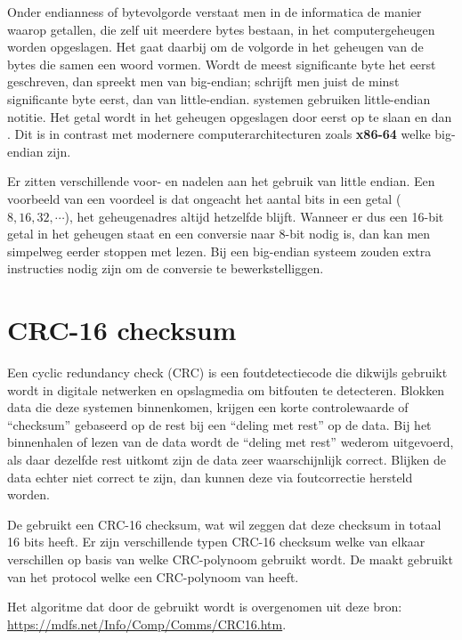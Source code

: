 Onder endianness of bytevolgorde verstaat men in de informatica de manier waarop getallen, die zelf uit meerdere bytes bestaan, in het computergeheugen worden opgeslagen. Het gaat daarbij om de volgorde in het geheugen van de bytes die samen een woord vormen. Wordt de meest significante byte het eerst geschreven, dan spreekt men van big-endian; schrijft men juist de minst significante byte eerst, dan van little-endian.  systemen gebruiken little-endian notitie. Het getal  wordt in het geheugen opgeslagen door eerst  op te slaan en dan . Dit is in contrast met modernere computerarchitecturen zoals \textbf{x86-64} welke big-endian zijn.

Er zitten verschillende voor- en nadelen aan het gebruik van little endian. Een voorbeeld van een voordeel is dat ongeacht het aantal bits in een getal ($8, 16, 32, \cdots$), het geheugenadres altijd hetzelfde blijft. Wanneer er dus een 16-bit getal in het geheugen staat en een conversie naar 8-bit nodig is, dan kan men simpelweg eerder stoppen met lezen. Bij een big-endian systeem zouden extra instructies nodig zijn om de conversie te bewerkstelliggen.

%
%
%
\section{CRC-16 checksum}
\label{sec:crc16-checksum}

Een cyclic redundancy check (CRC) is een foutdetectiecode die dikwijls gebruikt wordt in digitale netwerken en opslagmedia om bitfouten te detecteren. Blokken data die deze systemen binnenkomen, krijgen een korte controlewaarde of ``checksum'' gebaseerd op de rest bij een ``deling met rest'' op de data. Bij het binnenhalen of lezen van de data wordt de ``deling met rest'' wederom uitgevoerd, als daar dezelfde rest uitkomt zijn de data zeer waarschijnlijk correct. Blijken de data echter niet correct te zijn, dan kunnen deze via foutcorrectie hersteld worden.

De \product gebruikt een CRC-16 checksum, wat wil zeggen dat deze checksum in totaal 16 bits heeft. Er zijn verschillende typen CRC-16 checksum welke van elkaar verschillen op basis van welke CRC-polynoom gebruikt wordt. De \product maakt gebruikt van het  protocol welke een CRC-polynoom van  heeft.

Het algoritme dat door de \product gebruikt wordt is overgenomen uit deze bron: \url{https://mdfs.net/Info/Comp/Comms/CRC16.htm}.

